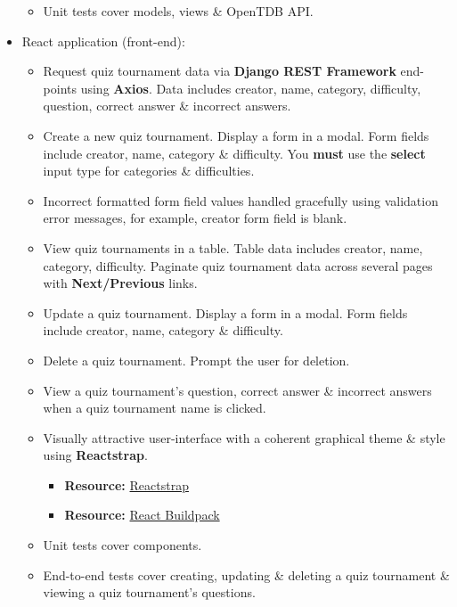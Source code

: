 \documentclass{article}
\begin{document}
\begin{itemize}
\begin{itemize}
\begin{itemize}
		\end{itemize}
		\item Unit tests cover models, views \& OpenTDB API.
	\end{itemize}
	\item React application (front-end):
	\begin{itemize}
		\item Request quiz tournament data via \textbf{Django REST Framework} end-points using \textbf{Axios}. Data includes creator, name, category, difficulty, question, correct answer \& incorrect answers. 
		\item Create a new quiz tournament. Display a form in a modal. Form fields include creator, name, category \& difficulty. You \textbf{must} use the \textbf{select} input type for categories \& difficulties.  
		\item Incorrect formatted form field values handled gracefully using validation error messages, for example, creator form field is blank.
		\item View quiz tournaments in a table. Table data includes creator, name, category, difficulty. Paginate quiz tournament data across several pages with \textbf{Next/Previous} links.
		\item Update a quiz tournament. Display a form in a modal. Form fields include creator, name, category \& difficulty.
		\item Delete a quiz tournament. Prompt the user for deletion.
		\item View a quiz tournament's question, correct answer \& incorrect answers when a quiz tournament name is clicked. 
		\item Visually attractive user-interface with a coherent graphical theme \& style using \textbf{Reactstrap}.
		\begin{itemize}
			\item \textbf{Resource:} \href{https://reactstrap.github.io/}{Reactstrap}
		\end{itemize}
		\begin{itemize}
			\item \textbf{Resource:} \href{https://github.com/mars/create-react-app-buildpack}{React Buildpack}
		\end{itemize}
		\item Unit tests cover components.
		\item End-to-end tests cover creating, updating \& deleting a quiz tournament \& viewing a quiz tournament’s questions.
	\end{itemize}
\end{itemize}
\end{document}
